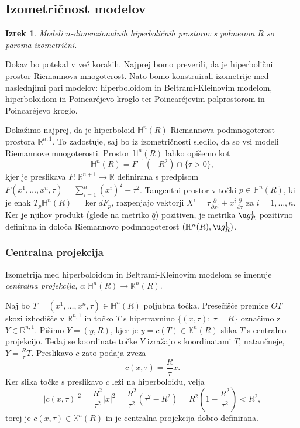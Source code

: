 \documentclass[a4paper]{article}
\newtheorem{izrek}{Izrek}
\begin{document}
\subsection{Izometričnost modelov}

\begin{izrek}
Modeli $n$-dimenzionalnih hiperboličnih prostorov s polmerom $R$ so paroma izometrični.
\end{izrek}

Dokaz bo potekal v več korakih. Najprej bomo preverili, da je hiperbolični prostor Riemannova mnogoterost. Nato bomo konstruirali izometrije med naslednjimi pari modelov: hiperboloidom in Beltrami-Kleinovim modelom, hiperboloidom in Poincar\'ejevo kroglo ter Poincar\'ejevim polprostorom in Poincar\'ejevo kroglo.

Dokažimo najprej, da je hiperboloid $\mathbb{H}^{n}(R)$ Riemannova podmnogoterost prostora $\mathbb{R}^{n,1}$. To zadostuje, saj bo iz izometričnosti sledilo, da so vsi modeli Riemannove mnogoterosti.
Prostor $\mathbb{H}^{n}(R)$ lahko opišemo kot 
\begin{equation}\label{eq:H^n enacba}
\mathbb{H}^{n}(R) = F^{-1}(-R^2) \cap \{ \tau>0 \},
\end{equation}
kjer je preslikava $F \colon \mathbb{R}^{n+1} \to \mathbb{R}$ definirana s predpisom $F(x^{1}, \dots , x^{n}, \tau) = \sum_{i=1}^{n} (x^{i})^2 - \tau^2$.
Tangentni prostor v točki $p \in \mathbb{H}^{n}(R)$, ki je enak $T_{p}\mathbb{H}^{n}(R) = \ker dF_{p}$, razpenjajo vektorji $X^{i} = \tau \frac{\partial}{\partial x^{i}} + x^{i} \frac{\partial}{\partial \tau}$ za $i = 1, \dots , n$. Ker je njihov produkt (glede na metriko $\bar{q}$) pozitiven, je metrika $\u g_{R}^{1}$ pozitivno definitna in določa Riemannovo podmnogoterost $(\mathbb{H}^{n}(R), \u g_{R}^{1})$. 

\subsubsection{Centralna projekcija}
Izometrija med hiperboloidom in Beltrami-Kleinovim modelom se imenuje \emph{centralna projekcija}, $c \colon \mathbb{H}^{n}(R) \to \mathbb{K}^{n}(R)$.

Naj bo $T=(x^{1}, \dots , x^{n}, \tau) \in \mathbb{H}^{n}(R)$ poljubna točka. Presečišče premice $OT$ skozi izhodišče v $\mathbb{R}^{n,1}$ in točko $T$ s hiperravnino $\{ (x, \tau); \ \tau=R \}$ označimo z $Y \in \mathbb{R}^{n,1}$. Pišimo $Y=(y,R)$, kjer je $y = c(T) \in \mathbb{K}^{n}(R)$ slika $T$ s centralno projekcijo. 
Tedaj se koordinate točke $Y$ izražajo s koordinatami $T$, natančneje, $Y=\frac{R}{\tau} T$. Preslikavo $c$ zato podaja zveza
\begin{equation}\label{eq: cent-proj}
c(x, \tau) = \frac{R}{\tau} x.
\end{equation}
Ker slika točke s preslikavo $c$ leži na hiperboloidu, velja
\[ |c(x,\tau)|^2 = \frac{R^2}{\tau^2} |x|^2 = \frac{R^2}{\tau^2}(\tau^2-R^2) = R^2 \left(1-\frac{R^2}{\tau^2} \right) < R^2, \]
torej je $c(x, \tau) \in \mathbb{K}^{n}(R)$ in je centralna projekcija dobro definirana.
\end{document}
